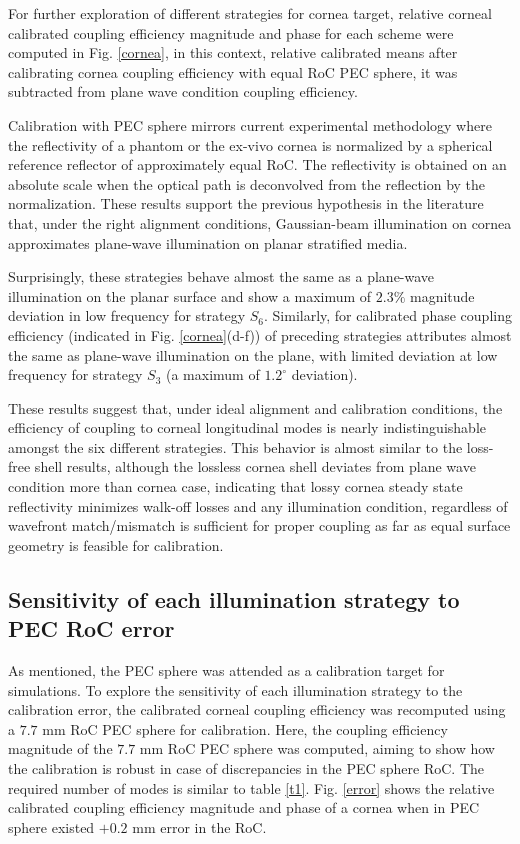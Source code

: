 \documentclass{osa-article}
\begin{document}
For further exploration of different strategies for cornea target, relative corneal calibrated coupling efficiency magnitude and phase for each scheme were computed in Fig. \ref{cornea}, in this context, relative calibrated means after calibrating cornea coupling efficiency with equal RoC PEC sphere, it was subtracted from plane wave condition coupling efficiency.

Calibration with PEC sphere mirrors current experimental methodology where the reflectivity of a phantom or the ex-vivo cornea is normalized by a spherical reference reflector of approximately equal RoC. The reflectivity is obtained on an absolute scale when the optical path is deconvolved from the reflection by the normalization. These results support the previous hypothesis in the literature that, under the right alignment conditions, Gaussian-beam illumination on cornea approximates plane-wave illumination on planar stratified media.

 Surprisingly, these strategies behave almost the same as a plane-wave illumination on the planar surface and show a maximum of $2.3 \%$ magnitude deviation in low frequency for strategy $S_6$. Similarly, for calibrated phase coupling efficiency (indicated in Fig. \ref{cornea}(d-f)) of preceding strategies attributes almost the same as plane-wave illumination on the plane, with limited deviation at low frequency for strategy $S_3$ (a maximum of $1.2^{\circ}$ deviation).

These results suggest that, under ideal alignment and calibration conditions, the efficiency of coupling to corneal longitudinal modes is nearly indistinguishable amongst the six different strategies. This behavior is almost similar to the loss-free shell results, although the lossless cornea shell deviates from plane wave condition more than cornea case, indicating that lossy cornea steady state reflectivity minimizes walk-off losses and any illumination condition, regardless of wavefront match/mismatch is sufficient for proper coupling as far as equal surface geometry is feasible for calibration. 

\subsection{Sensitivity of each illumination strategy to PEC RoC error }

 As mentioned, the PEC sphere was attended as a calibration target for simulations. To explore the sensitivity of each illumination strategy to the calibration error, the calibrated corneal coupling efficiency was recomputed using a $7.7$ mm RoC PEC sphere for calibration. Here, the coupling efficiency magnitude of the $7.7$ mm RoC PEC sphere was computed, aiming to show how the calibration is robust in case of discrepancies in the PEC sphere RoC. The required number of modes is similar to table \ref{t1}. Fig. \ref{error} shows the relative calibrated coupling efficiency magnitude and phase of a cornea when in PEC sphere existed $+0.2$ mm error in the RoC.
\end{document}

